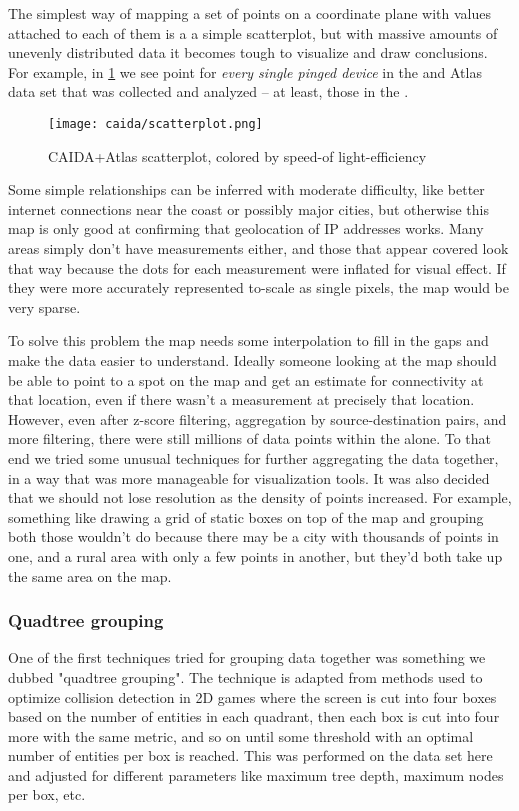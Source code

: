 The simplest way of mapping a set of points on a coordinate plane with values attached to each of them is a a simple scatterplot, but with massive amounts of unevenly distributed data it becomes tough to visualize and draw conclusions. For example, in \cref{fig:caida_scatterplot} we see point for \textit{every single pinged device} in the \caida and \ripe Atlas data set that was collected and analyzed -- at least, those in the \us.

\begin{figure}[h]
    \centering
    \texttt{[image: caida/scatterplot.png]}
    \caption{CAIDA+Atlas scatterplot, colored by speed-of light-efficiency}
    \label{fig:caida_scatterplot}
\end{figure}

Some simple relationships can be inferred with moderate difficulty, like better internet connections near the coast or possibly major cities, but otherwise this map is only good at confirming that geolocation of IP addresses works. Many areas simply don't have measurements either, and those that appear covered look that way because the dots for each measurement were inflated for visual effect. If they were more accurately represented to-scale as single pixels, the map would be very sparse.

To solve this problem the map needs some interpolation to fill in the gaps and make the data easier to understand. Ideally someone looking at the map should be able to point to a spot on the map and get an estimate for connectivity at that location, even if there wasn't a measurement at precisely that location. However, even after z-score filtering, aggregation by source-destination pairs, and more filtering, there were still millions of data points within the \us alone. To that end we tried some unusual techniques for further aggregating the data together, in a way that was more manageable for visualization tools. It was also decided that we should not lose resolution as the density of points increased. For example, something like drawing a grid of static boxes on top of the map and grouping both those wouldn't do because there may be a city with thousands of points in one, and a rural area with only a few points in another, but they'd both take up the same area on the map.

\subsubsection{Quadtree grouping} One of the first techniques tried for grouping data together was something we dubbed "quadtree grouping". The technique is adapted from methods used to optimize collision detection in 2D games where the screen is cut into four boxes based on the number of entities in each quadrant, then each box is cut into four more with the same metric, and so on until some threshold with an optimal number of entities per box is reached. This was performed on the data set here and adjusted for different parameters like maximum tree depth, maximum nodes per box, etc.

